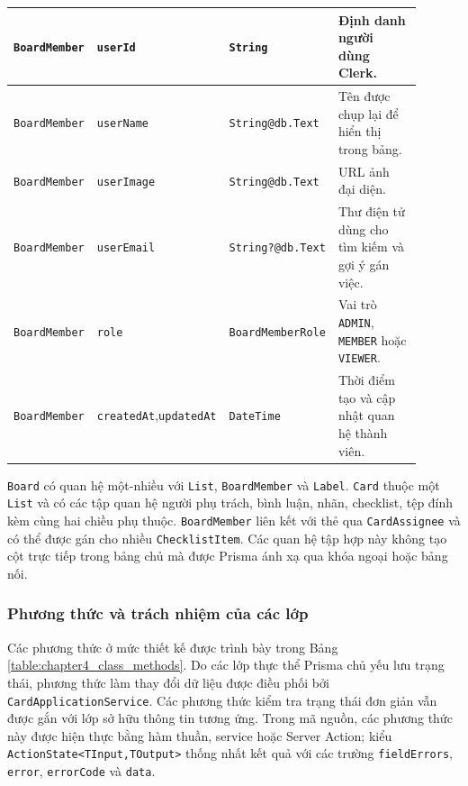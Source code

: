 \documentclass[../DoAn.tex]{subfiles}
\begin{document}
\begin{longtable}{|>{\raggedright\arraybackslash}p{0.15\linewidth}|>{\raggedright\arraybackslash}p{0.22\linewidth}|>{\raggedright\arraybackslash}p{0.19\linewidth}|>{\raggedright\arraybackslash}p{0.34\linewidth}|}
    \texttt{Board}\newline\texttt{Member} & \texttt{userId} & \texttt{String} & Định danh người dùng Clerk. \\ \hline
    \texttt{Board}\newline\texttt{Member} & \texttt{userName} & \texttt{String}\newline\texttt{@db.Text} & Tên được chụp lại để hiển thị trong bảng. \\ \hline
    \texttt{Board}\newline\texttt{Member} & \texttt{userImage} & \texttt{String}\newline\texttt{@db.Text} & URL ảnh đại diện. \\ \hline
    \texttt{Board}\newline\texttt{Member} & \texttt{userEmail} & \texttt{String?}\newline\texttt{@db.Text} & Thư điện tử dùng cho tìm kiếm và gợi ý gán việc. \\ \hline
    \texttt{Board}\newline\texttt{Member} & \texttt{role} & \texttt{BoardMember}\newline\texttt{Role} & Vai trò \texttt{ADMIN}, \texttt{MEMBER} hoặc \texttt{VIEWER}. \\ \hline
    \texttt{Board}\newline\texttt{Member} & \texttt{createdAt},\newline\texttt{updatedAt} & \texttt{DateTime} & Thời điểm tạo và cập nhật quan hệ thành viên. \\ \hline
\end{longtable}
\endgroup

\texttt{Board} có quan hệ một-nhiều với \texttt{List}, \texttt{BoardMember} và \texttt{Label}. \texttt{Card} thuộc một \texttt{List} và có các tập quan hệ người phụ trách, bình luận, nhãn, checklist, tệp đính kèm cùng hai chiều phụ thuộc. \texttt{BoardMember} liên kết với thẻ qua \texttt{CardAssignee} và có thể được gán cho nhiều \texttt{ChecklistItem}. Các quan hệ tập hợp này không tạo cột trực tiếp trong bảng chủ mà được Prisma ánh xạ qua khóa ngoại hoặc bảng nối.

\subsubsection{Phương thức và trách nhiệm của các lớp}
\label{subsubsection:4.2.2.b}

Các phương thức ở mức thiết kế được trình bày trong Bảng \ref{table:chapter4_class_methods}. Do các lớp thực thể Prisma chủ yếu lưu trạng thái, phương thức làm thay đổi dữ liệu được điều phối bởi \texttt{CardApplicationService}. Các phương thức kiểm tra trạng thái đơn giản vẫn được gắn với lớp sở hữu thông tin tương ứng. Trong mã nguồn, các phương thức này được hiện thực bằng hàm thuần, service hoặc Server Action; kiểu \texttt{ActionState<TInput,TOutput>} thống nhất kết quả với các trường \texttt{fieldErrors}, \texttt{error}, \texttt{errorCode} và \texttt{data}.
\end{document}
